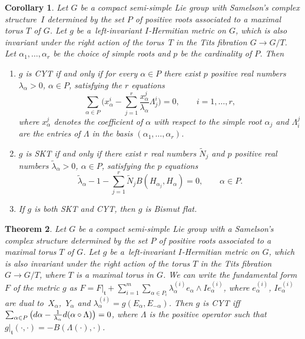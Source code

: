\documentclass[10pt,a4paper]{article}
\numberwithin{equation}{section}
\newtheorem{Theorem}{Theorem}[section]
\newtheorem{Corollary}[Theorem]{Corollary}
\theoremstyle{definition}
\begin{document}
\begin{Corollary} \label{coroBismutflat}
Let $G$ be a compact semi-simple Lie group with Samelson's complex structure~$I$ determined by the set $P$ of positive roots associated to a maximal torus $T$ of $G$. Let $g$ be a~left-invariant $I$-Hermitian metric on $G$, which is also invariant under the right action of the torus~$T$ in the Tits fibration $G\rightarrow G/T$. Let $\alpha_1, \dots,\alpha_r$ be the choice of simple roots and $p$ be the cardinality of $P$.
Then
\begin{enumerate}
 \item[$(i)$] $g$ is CYT if and only if for every $\alpha \in P$ there exist $p$ positive real numbers $\lambda_{\alpha} > 0$, $\alpha \in P$, satisfying the $r$ equations
\begin{equation}\label{CYTsystem}
\sum_{\alpha \in P} \Bigg( x_\alpha^i - \sum_{j=1}^r \frac{x_\alpha^j}{\lambda_{\alpha}} \Lambda^i_j \Bigg) =0, \qquad i = 1, \dots, r,
\end{equation}
where $x_{\alpha}^j$ denotes the coefficient of $\alpha$ with respect to the simple root $\alpha_j$ and $\Lambda_i^j$ are the entries of $\Lambda$ in the basis $(\alpha_1, \dots,\alpha_r)$.
 \item[$(ii)$] $g$ is SKT if and only if there exist $r$ real numbers $ \tilde N_j$ and $p$ positive real numbers $ \tilde \lambda_{\alpha} >0$, $\alpha \in P$, satisfying the $p$ equations
\begin{equation}\label{SKTsystem}
\tilde \lambda_{\alpha} - 1 - \sum_{j = 1}^r \tilde N_j B(H_{\alpha_j}, H_{\alpha})=0, \qquad \alpha \in P.
\end{equation}
 \item[$(iii)$] If $g$ is both SKT and CYT, then $g$ is Bismut flat.
 \end{enumerate}
\end{Corollary}

\begin{Theorem} \label{th4.1}
Let $G$ be a compact semi-simple Lie group with a Samelson's complex structure determined by the set $P$ of positive roots associated to a maximal torus $T$ of $G$. Let $g$ be a~left-invariant $I$-Hermitian metric on $G$, which is also invariant under the right action of the torus $T$ in the Tits fibration $G\rightarrow G/T$, where $T$ is a maximal torus in $G$. We can write the fundamental form $F$ of the metric $g$
as $F = F|_{\mathfrak t} + \sum_{i=1}^m \sum_{\alpha \in P_i} \lambda_{\alpha} ^{(i)} e_{\alpha}\wedge I e_{\alpha}^{(i)}$, where $e_{\alpha}^{(i)}$, $Ie_{\alpha}^{(i)}$ are dual to~$X_{\alpha}$,~$Y_{\alpha}$ and $\lambda_{\alpha} ^{(i)}= g (E_{\alpha}, E_{-\alpha})$. Then
$g$ is CYT iff $\sum_{\alpha \in P} \big({\rm d}\alpha - \frac{1}{\lambda_{\alpha}} {\rm d}(\alpha\circ\Lambda) \big) = 0$, where $\Lambda$ is the positive operator such that $g |_{\mathfrak t} (\cdot, \cdot ) = -B (\Lambda (\cdot), \cdot)$.
\end{Theorem}
\end{document}
